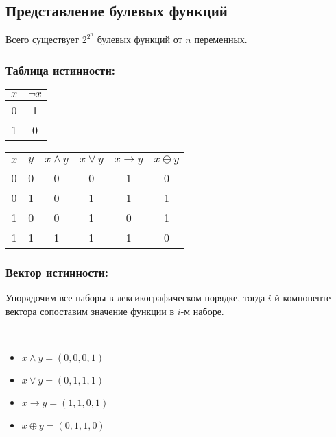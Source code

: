 \subsection{Представление булевых функций}

\begin{notice}
    Всего существует $2^{2^{n}}$ булевых функций от $n$ переменных.
\end{notice}

\subsubsection*{Таблица истинности:}

\begin{center}
    \begin{tabular}{c|c}
        $x$ & $\neg x$ \\ 
        \hline
        0 & 1 \\
        1 & 0
    \end{tabular}
    \quad \quad \quad
    \begin{tabular}{c c|c c c c}
        $x$ & $y$ & $x \wedge y$ & $x \vee y$ & $x \to y$ & $x \oplus y$ \\ 
        \hline
        0 & 0 & 0 & 0 & 1 & 0\\
        0 & 1 & 0 & 1 & 1 & 1\\
        1 & 0 & 0 & 1 & 0 & 1\\
        1 & 1 & 1 & 1 & 1 & 0
    \end{tabular}
\end{center}

\subsubsection*{Вектор истинности:}

Упорядочим все наборы в лексикографическом порядке, тогда $i$-й компоненте вектора сопоставим значение функции в $i$-м наборе.\\

\begin{examples}~
    \begin{itemize}
        \item $x \wedge y = (0, 0, 0, 1)$
        \item $x \vee y = (0, 1, 1, 1)$
        \item $x \to y = (1, 1, 0, 1)$
        \item $x \oplus y = (0, 1, 1, 0)$
    \end{itemize} 
\end{examples}